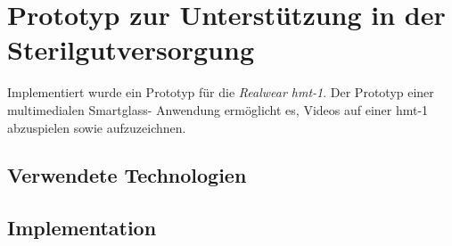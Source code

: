 %
%
%
%
%
%
\chapter{Prototyp zur Unterstützung in der Sterilgutversorgung}
\label{ch:Prototyp}
Implementiert wurde ein Prototyp für die \emph{Realwear hmt-1}. Der Prototyp einer multimedialen Smartglass- Anwendung ermöglicht es, Videos auf einer hmt-1 abzuspielen sowie aufzuzeichnen. 
%
%
%
%
%
%
\section{Verwendete Technologien}
\label{sec:Verwendete_Technologien}
%
%
%
%
%
%
\section{Implementation}
\label{sec:Implementation}
